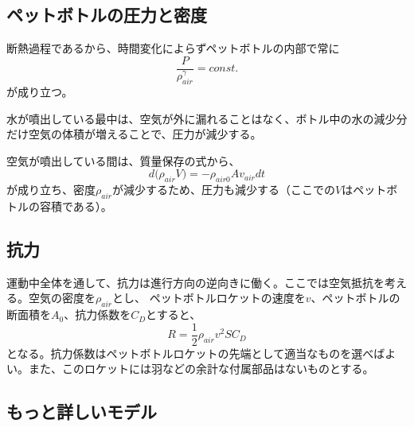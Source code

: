 \documentclass{article}
\begin{document}
\subsection{ ペットボトルの圧力と密度 }

断熱過程であるから、時間変化によらずペットボトルの内部で常に
\begin{equation}
\frac{P}{\rho_{air}^\gamma} = const.
\end{equation}
が成り立つ。

水が噴出している最中は、空気が外に漏れることはなく、ボトル中の水の減少分だけ空気の体積が増えることで、圧力が減少する。

空気が噴出している間は、質量保存の式から、
\begin{equation}
d ({\rho_{air}V)} = - \rho_{air0} A v_{air} dt
\end{equation}
が成り立ち、密度$\rho_{air}$が減少するため、圧力も減少する（ここでの$V$はペットボトルの容積である）。

\subsection{ 抗力 }

運動中全体を通して、抗力は進行方向の逆向きに働く。ここでは空気抵抗を考える。空気の密度を$\rho_{air}$とし、
ペットボトルロケットの速度を$v$、ペットボトルの断面積を$A_0$、抗力係数を$C_D$とすると、
\begin{equation}
R = \frac{1}{2}\rho_{air}v^2 S C_D
\end{equation}
となる。抗力係数はペットボトルロケットの先端として適当なものを選べばよい。また、このロケットには羽などの余計な付属部品はないものとする。

\subsection{ もっと詳しいモデル }
\end{document}
